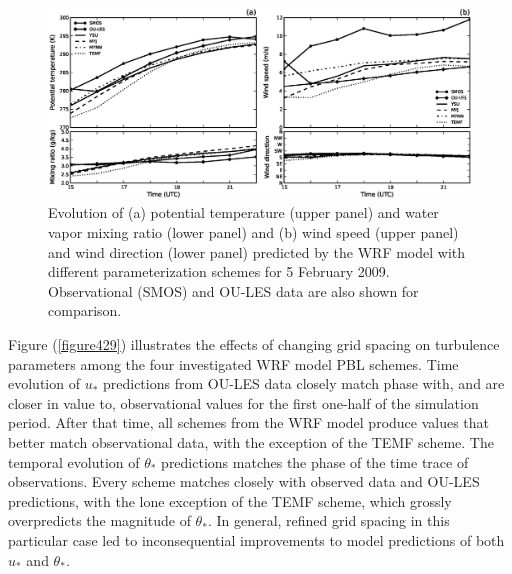 \begin{figure}[ht!]
\begin{center}
\includegraphics[width=\textwidth]{figures/chapter4/meteogram_phys_20090205}
\end{center}
\caption{Evolution of (a) potential temperature (upper panel) and water vapor mixing ratio (lower panel) and (b) wind speed (upper panel) and wind direction (lower panel) predicted by the WRF model with different parameterization schemes for 5 February 2009. Observational (SMOS) and OU-LES data are also shown for comparison.}
\label{figure430}
\end{figure}


Figure (\autoref{figure429}) illustrates the effects of changing grid spacing on turbulence parameters among the four investigated WRF model PBL schemes. Time evolution of $u_*$ predictions from OU-LES data closely match phase with, and are closer in value to, observational values for the first one-half of the simulation period. After that time, all schemes from the WRF model produce values that better match observational data, with the exception of the TEMF scheme. The temporal evolution of $\theta_*$ predictions matches the phase of the time trace of observations. Every scheme matches closely with observed data and OU-LES predictions, with the lone exception of the TEMF scheme, which grossly overpredicts the magnitude of $\theta_*$. In general, refined grid spacing in this particular case led to inconsequential improvements to model predictions of both $u_*$ and $\theta_*$. 

